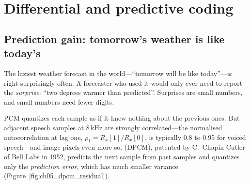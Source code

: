 
\section{Differential and predictive coding}
\label{sec:ch05:dpcm}

\subsection{Prediction gain: tomorrow's weather is like today's}

The laziest weather forecast in the world---``tomorrow will be like today''---is right surprisingly
often. A forecaster who used it would only ever need to report the \emph{surprise}: ``two degrees
warmer than predicted''. Surprises are small numbers, and small numbers need fewer digits.

PCM quantizes each sample as if it knew nothing about the previous ones. But adjacent speech
samples at 8\,kHz are strongly correlated---the normalised autocorrelation at lag one,
$\rho_1=R_x[1]/R_x[0]$, is typically 0.8 to 0.95 for voiced speech---and image pixels even more so.
 (DPCM), patented by C.~Chapin Cutler of Bell Labs in 1952, predicts the
next sample from past samples and quantizes only the \emph{prediction error}, which has much
smaller variance (Figure~\ref{fig:ch05_dpcm_residual}).

